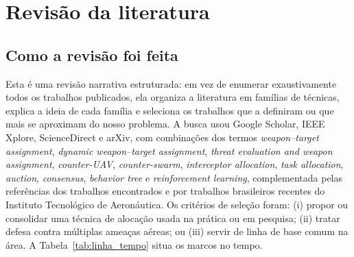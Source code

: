 \section{Revisão da literatura}\label{sec:revisao}

\subsection{Como a revisão foi feita}
Esta é uma revisão narrativa estruturada: em vez de enumerar exaustivamente todos os trabalhos publicados, ela organiza a
literatura em famílias de técnicas, explica a ideia de cada família e seleciona os trabalhos que a definiram ou que mais
se aproximam do nosso problema. A busca usou Google Scholar, IEEE Xplore, ScienceDirect e arXiv, com combinações dos termos
\emph{weapon--target assignment}, \emph{dynamic weapon--target assignment}, \emph{threat evaluation and weapon assignment},
\emph{counter-UAV}, \emph{counter-swarm}, \emph{interceptor allocation}, \emph{task allocation}, \emph{auction},
\emph{consensus}, \emph{behavior tree} e \emph{reinforcement learning}, complementada pelas referências dos trabalhos
encontrados e por trabalhos brasileiros recentes do Instituto Tecnológico de Aeronáutica. Os critérios de seleção foram:
(i) propor ou consolidar uma técnica de alocação usada na prática ou em pesquisa; (ii) tratar defesa contra múltiplas
ameaças aéreas; ou (iii) servir de linha de base comum na área. A Tabela~\ref{tab:linha_tempo} situa os marcos no tempo.

